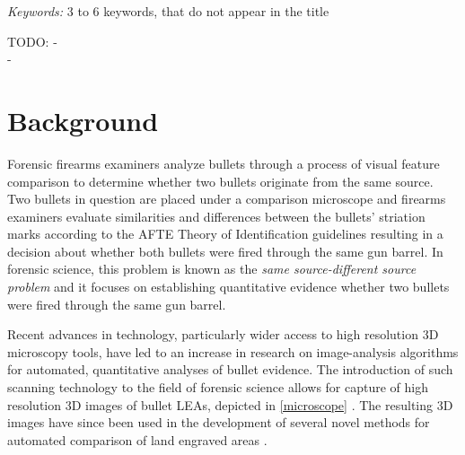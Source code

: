 \documentclass[12pt]{article}
\begin{document}
\noindent%
{\it Keywords:} 3 to 6 keywords, that do not appear in the title
\vfill

\newpage
{} %

\newcommand{\hh}[1]{{\color{orange}{#1}}}
\newcommand{\kr}[1]{{\color{teal}{#1}}}
\newcommand{\ug}[1]{{\color{purple}{#1}}}

TODO: - \kr{Abstract}\\
- \kr{End of background summary}

\section{Background}

Forensic firearms examiners analyze bullets through a process of visual
feature comparison to determine whether two bullets originate from the
same source. Two bullets in question are placed under a comparison
microscope and firearms examiners evaluate similarities and differences
between the bullets' striation marks according to the AFTE Theory of
Identification \citep{AFTE} guidelines resulting in a decision about
whether both bullets were fired through the same gun barrel. In forensic
science, this problem is known as the \emph{same source-different source
problem} and it focuses on establishing quantitative evidence whether
two bullets were fired through the same gun barrel.

Recent advances in technology, particularly wider access to high
resolution 3D microscopy tools, have led to an increase in research on
image-analysis algorithms for automated, quantitative analyses of bullet
evidence. The introduction of such scanning technology to the field of
forensic science allows for capture of high resolution 3D images of
bullet LEAs, depicted in \autoref{microscope}
\citep[see][]{DeKinder1, DeKinder2, Bachrach1}. The resulting 3D images
have since been used in the development of several novel methods for
automated comparison of land engraved areas
\citep[e.g.][]{Ma1, Chu1, Chu2, Hare1}.
\end{document}
